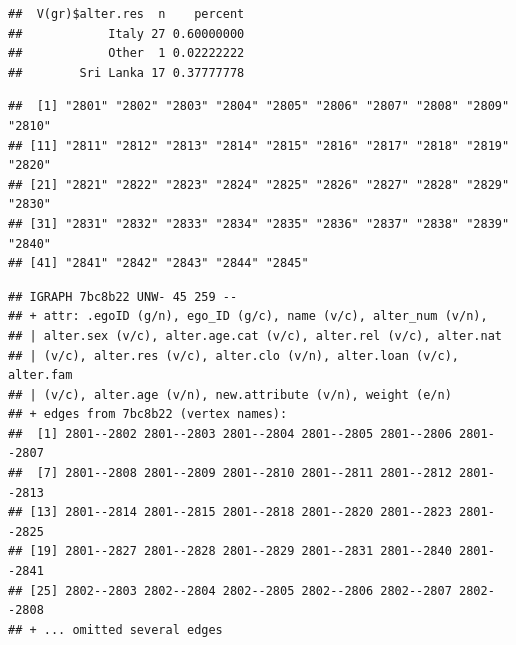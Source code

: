 \documentclass[
]{book}
\newenvironment{Shaded}{\begin{snugshade}}{\end{snugshade}}
\newcommand{\CommentTok}[1]{\textcolor[rgb]{0.56,0.35,0.01}{\textit{#1}}}
\newcommand{\DecValTok}[1]{\textcolor[rgb]{0.00,0.00,0.81}{#1}}
\newcommand{\FunctionTok}[1]{\textcolor[rgb]{0.13,0.29,0.53}{\textbf{#1}}}
\newcommand{\NormalTok}[1]{#1}
\newcommand{\OtherTok}[1]{\textcolor[rgb]{0.56,0.35,0.01}{#1}}
\newcommand{\SpecialCharTok}[1]{\textcolor[rgb]{0.81,0.36,0.00}{\textbf{#1}}}
\begin{document}
\begin{Shaded}
\end{Shaded}

\begin{verbatim}
##  V(gr)$alter.res  n    percent
##            Italy 27 0.60000000
##            Other  1 0.02222222
##        Sri Lanka 17 0.37777778
\end{verbatim}

\begin{Shaded}
\end{Shaded}

\begin{verbatim}
##  [1] "2801" "2802" "2803" "2804" "2805" "2806" "2807" "2808" "2809" "2810"
## [11] "2811" "2812" "2813" "2814" "2815" "2816" "2817" "2818" "2819" "2820"
## [21] "2821" "2822" "2823" "2824" "2825" "2826" "2827" "2828" "2829" "2830"
## [31] "2831" "2832" "2833" "2834" "2835" "2836" "2837" "2838" "2839" "2840"
## [41] "2841" "2842" "2843" "2844" "2845"
\end{verbatim}

\begin{Shaded}
\end{Shaded}

\begin{verbatim}
## IGRAPH 7bc8b22 UNW- 45 259 -- 
## + attr: .egoID (g/n), ego_ID (g/c), name (v/c), alter_num (v/n),
## | alter.sex (v/c), alter.age.cat (v/c), alter.rel (v/c), alter.nat
## | (v/c), alter.res (v/c), alter.clo (v/n), alter.loan (v/c), alter.fam
## | (v/c), alter.age (v/n), new.attribute (v/n), weight (e/n)
## + edges from 7bc8b22 (vertex names):
##  [1] 2801--2802 2801--2803 2801--2804 2801--2805 2801--2806 2801--2807
##  [7] 2801--2808 2801--2809 2801--2810 2801--2811 2801--2812 2801--2813
## [13] 2801--2814 2801--2815 2801--2818 2801--2820 2801--2823 2801--2825
## [19] 2801--2827 2801--2828 2801--2829 2801--2831 2801--2840 2801--2841
## [25] 2802--2803 2802--2804 2802--2805 2802--2806 2802--2807 2802--2808
## + ... omitted several edges
\end{verbatim}
\end{document}
